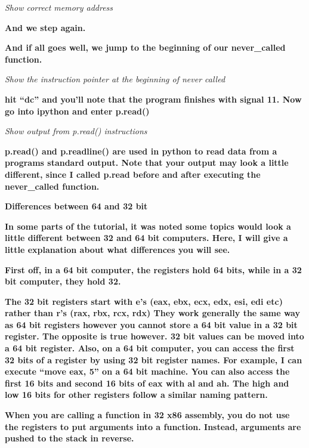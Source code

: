 \documentclass[letterpaper]{article}
\newcommand{\sitfig}[3]{
\begin{figure}[H]
\centering
\makebox[\textwidth][c]{
#2
}
\label{#1}
\end{figure}
}
\newcommand{\sitgfx}[4][scale=1.0]{
\sitfig{#3}{\texttt{[image: \#2]}}{#4}
}
\begin{document}
\textit{Show correct memory address}

\textbf{And we step again.}

  
\sitgfx[width=5.8335in,height=3.6457in]{reversing-img107.png}{fig:unk}{TODO CAPTION}
 

\textbf{And if all goes well, we jump to the beginning of our never\_called function.}

  
\sitgfx[width=5.8335in,height=3.6457in]{reversing-img096.png}{fig:unk}{TODO CAPTION}
 

\textit{Show the instruction pointer at the beginning of never called}

\textbf{hit ``dc'' and you'll note that the program finishes with signal 11. Now go into ipython and enter p.read()}

  
\sitgfx[width=5.8335in,height=3.6457in]{reversing-img108.png}{fig:unk}{TODO CAPTION}
 

\textit{Show output from p.read() instructions}

\textbf{p.read() and p.readline() are used in python to read data from a programs standard output. Note that your output
may look a little different, since I called p.read before and after executing the never\_called function.}

{\centering
\textbf{Differences between 64 and 32 bit}
\par}

\textbf{In some parts of the tutorial, it was noted some topics would look a little different between 32 and 64 bit
computers. Here, I will give a little explanation about what differences you will see. }

\textbf{First off, in a 64 bit computer, the registers hold 64 bits, while in a 32 bit computer, they hold 32. }

\textbf{The 32 bit registers start with e's (eax, ebx, ecx, edx, esi, edi etc) rather than r's (rax, rbx, rcx, rdx) They
work generally the same way as 64 bit registers however you cannot store a 64 bit value in a 32 bit register. The
opposite is true however. 32 bit values can be moved into a 64 bit register. Also, on a 64 bit computer, you can access
the first 32 bits of a register by using 32 bit register names. For example, I can execute ``move eax, 5'' on a 64 bit
machine. You can also access the first 16 bits and second 16 bits of eax with al and ah. The high and low 16 bits for
other registers follow a similar naming pattern. }

\textbf{When you are calling a function in 32 x86 assembly, you do not use the registers to put arguments into a
function. Instead, arguments are pushed to the stack in reverse. }
\end{document}
